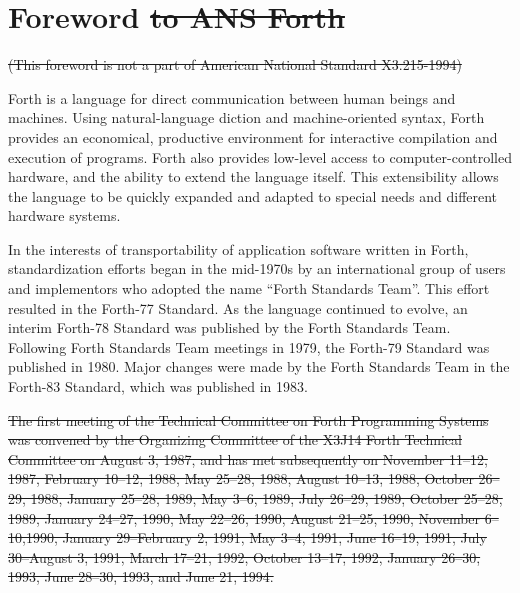 \cbstart{}
\vspace*{-6ex}\chapter*{Foreword\sout{ to ANS Forth}}

\sout{%
(This foreword is not a part of American National Standard X3.215-1994)
}
\cbend

Forth is a language for direct communication between human beings and
machines. 
Using natural-language diction and machine-oriented syntax,
Forth provides an economical, productive environment for interactive
compilation and execution of programs. Forth also provides low-level
access to computer-controlled hardware, and the ability to extend the
language itself. This extensibility allows the language to be quickly
expanded and adapted to special needs and different hardware systems.


In the interests of transportability of application software written in
Forth, standardization efforts began in the mid-1970s by an international
group of users and implementors who adopted the name ``Forth Standards Team''.
This effort resulted in the Forth-77 Standard. As the language continued
to evolve, an interim Forth-78 Standard was published by the Forth Standards
Team. Following Forth Standards Team meetings in 1979, the Forth-79 Standard
was published in 1980. Major changes were made by the Forth Standards Team
in the Forth-83 Standard, which was published in 1983.

\cbstart\sout{%
The first meeting of the Technical Committee on Forth Programming Systems
was convened by the Organizing Committee of the X3J14 Forth Technical
Committee on August 3, 1987, and has met subsequently on
November 11--12, 1987,
February 10--12, 1988,
May 25--28, 1988,
August 10--13, 1988,
October 26--29, 1988,
January 25--28, 1989,
May 3--6, 1989,
July 26--29, 1989,
October 25--28, 1989,
January 24--27, 1990,
May 22--26, 1990,
August 21--25, 1990,
November 6--10,1990,
January 29--February 2, 1991,
May 3--4, 1991,
June 16--19, 1991,
July 30--August 3, 1991,
March 17--21, 1992,
October 13--17, 1992,
January 26--30, 1993,
June 28--30, 1993,
and
June 21, 1994.}

